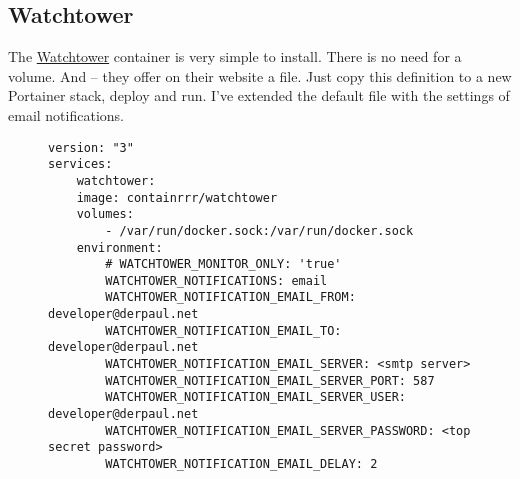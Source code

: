 

\subsection{Watchtower}

The \href{https://containrrr.dev/watchtower/}{Watchtower} container is very
simple to install. There is no need for a volume. And -- they offer on their
website a  file. Just copy this definition
to a new Portainer stack, deploy and run. I've extended the default file with
the settings of email notifications.

\begin{figure}[H]
    \scriptsize
    \centering
    \begin{BVerbatim}
version: "3"
services:
    watchtower:
    image: containrrr/watchtower
    volumes:
        - /var/run/docker.sock:/var/run/docker.sock
    environment:
        # WATCHTOWER_MONITOR_ONLY: 'true'
        WATCHTOWER_NOTIFICATIONS: email
        WATCHTOWER_NOTIFICATION_EMAIL_FROM: developer@derpaul.net
        WATCHTOWER_NOTIFICATION_EMAIL_TO: developer@derpaul.net
        WATCHTOWER_NOTIFICATION_EMAIL_SERVER: <smtp server>
        WATCHTOWER_NOTIFICATION_EMAIL_SERVER_PORT: 587
        WATCHTOWER_NOTIFICATION_EMAIL_SERVER_USER: developer@derpaul.net
        WATCHTOWER_NOTIFICATION_EMAIL_SERVER_PASSWORD: <top secret password>
        WATCHTOWER_NOTIFICATION_EMAIL_DELAY: 2
    \end{BVerbatim}
\end{figure}

